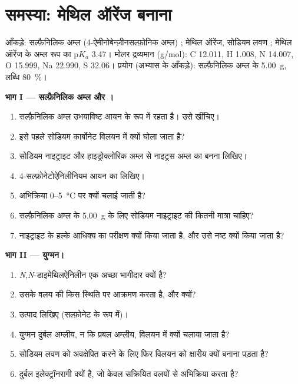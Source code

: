 \section{समस्या: मेथिल ऑरेंज बनाना}

\begin{problem}
\label{pb:b2:amines:1}
आँकड़े: सल्फ़ैनिलिक अम्ल (4-ऐमीनोबेन्ज़ीनसल्फ़ोनिक अम्ल) ; मेथिल ऑरेंज, सोडियम लवण
; मेथिल ऑरेंज के अम्ल रूप का $\mathrm pK_a$ 3.47। मोलर द्रव्यमान
(\unit{g/mol}): C 12.011, H 1.008, N 14.007, O 15.999, Na 22.990, S 32.06। प्रयोग (अभ्यास के आँकड़े):
सल्फ़ैनिलिक अम्ल के \qty{5.00}{g}, लब्धि 80~\%।

\medskip
\noindent\textbf{भाग I --- सल्फ़ैनिलिक अम्ल और ।}
\begin{enumerate}
  \item सल्फ़ैनिलिक अम्ल उभयाविष्ट आयन के रूप में रहता है। उसे खींचिए।
  \item इसे पहले सोडियम कार्बोनेट विलयन में क्यों घोला जाता है?
  \item सोडियम नाइट्राइट और हाइड्रोक्लोरिक अम्ल से नाइट्रस अम्ल का बनना लिखिए।
  \item 4-सल्फ़ोनेटोऐनिलीनियम आयन का  लिखिए।
  \item अभिक्रिया 0--\qty{5}{\degreeCelsius} पर क्यों चलाई जाती है?
  \item सल्फ़ैनिलिक अम्ल के \qty{5.00}{g} के लिए सोडियम नाइट्राइट की कितनी मात्रा चाहिए?
  \item नाइट्राइट के हल्के आधिक्य का परीक्षण क्यों किया जाता है, और उसे नष्ट क्यों किया जाता है?
\end{enumerate}

\medskip
\noindent\textbf{भाग II --- युग्मन।}
\begin{enumerate}[resume]
  \item \textit{N},\textit{N}-डाइमेथिलऐनिलीन एक अच्छा भागीदार क्यों है?
  \item {} उसके वलय की किस स्थिति पर आक्रमण करता है, और क्यों?
  \item उत्पाद लिखिए (सल्फ़ोनेट के रूप में)।
  \item युग्मन दुर्बल अम्लीय, न कि प्रबल अम्लीय, विलयन में क्यों चलाया जाता है?
  \item सोडियम लवण को अवक्षेपित करने के लिए फिर विलयन को क्षारीय क्यों बनाना पड़ता है?
  \item {} दुर्बल इलेक्ट्रॉनरागी क्यों है, जो केवल सक्रियित वलयों से अभिक्रिया करता है?
\end{enumerate}


\end{problem}
